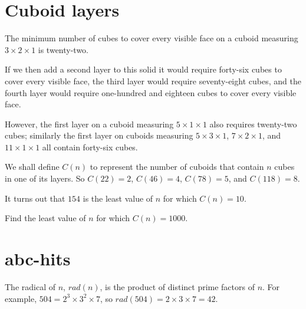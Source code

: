 \section{Cuboid layers} \label{pb.0126}

The minimum number of cubes to cover every visible face on a cuboid measuring $3 \times 2 \times 1$ is twenty-two.

\begin{center}
\end{center}

If we then add a second layer to this solid it would require forty-six cubes to cover every visible face, the third layer would require seventy-eight cubes, and the fourth layer would require one-hundred and eighteen cubes to cover every visible face.

However, the first layer on a cuboid measuring $5 \times 1 \times 1$ also requires twenty-two cubes; similarly the first layer on cuboids measuring $5 \times 3 \times 1$, $7 \times 2 \times 1$, and $11 \times 1 \times 1$ all contain forty-six cubes.

We shall define $C(n)$ to represent the number of cuboids that contain $n$ cubes in one of its layers. So $C(22) = 2$, $C(46) = 4$, $C(78) = 5$, and $C(118) = 8$.

It turns out that $154$ is the least value of $n$ for which $C(n) = 10$.
\medskip

Find the least value of $n$ for which $C(n) = 1000$.


\section{abc-hits} \label{pb.0127}

The radical of $n$, $rad(n)$, is the product of distinct prime factors of $n$. For example, $504 = 2^3 \times 3^2 \times 7$, so $rad(504) = 2 \times 3 \times 7 = 42$.

